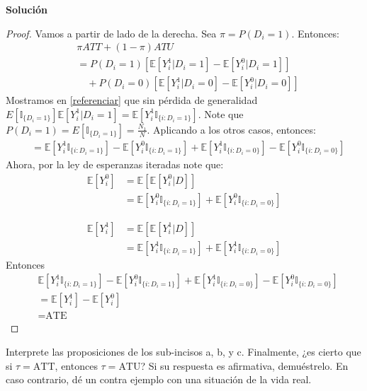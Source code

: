 \documentclass[a4paper, answers, addpoints, 11pt]{exam}
\newenvironment{solucion}{%
  \begin{mdframed}[
    backgroundcolor=blue!5,    %
    linecolor=blue!50,          %
    linewidth=2pt,              %
    leftmargin=10pt,            %
    rightmargin=8pt,           %
    topline=true,              %
    bottomline=true,            %
    roundcorner=10pt,           %
    innerleftmargin=10pt,       %
    innerrightmargin=10pt,      %
    innerbottommargin=10pt,     %
    innertopmargin=10pt         %
  ]%
  \begin{tcolorbox}[colframe=blue!50!black, colback=blue!50, coltitle=white, sharp corners=all, boxrule=1mm, width=\textwidth, halign=left, valign=center, top=0mm, bottom=0mm, left=0mm, right=0mm] \textbf{Solución} \end{tcolorbox} }{\end{mdframed}}
\begin{document}
\begin{itemize}
\begin{itemize}
\begin{solucion}
\begin{proof}
       Vamos a partir de lado de la derecha. Sea $\pi = P(D_i=1)$. Entonces:
\begin{align*}
    & \pi ATT + (1 - \pi) ATU \\
    &= P(D_i=1) \left[ \mathbb{E}[Y_i^1 | D_i=1] - \mathbb{E}[Y_i^0 | D_i=1] \right] \\
    &\quad + P(D_i=0) \left[ \mathbb{E}[Y_i^1 | D_i=0] - \mathbb{E}[Y_i^0 | D_i=0] \right] 
    \end{align*}
    Mostramos en \ref{referenciar} que sin pérdida de generalidad $E[\mathbb{I}_{\{D_i=1\}}]  \mathbb{E}[Y_i^1 | D_i=1] =\mathbb{E}[Y_i^1 \mathbb{I}_{\{i: D_i=1\}}]$. Note que  $ P(D_i=1)=E[\mathbb{I}_{\{D_i=1\}}] =\frac{N_1}{N}$. Aplicando a los otros casos, entonces:
    \begin{align*}
    &= \mathbb{E}[Y_i^1 \mathbb{I}_{\{i: D_i=1\}}] - \mathbb{E}[Y_i^0 \mathbb{I}_{\{i: D_i=1\}}]  + \mathbb{E}[Y_i^1 \mathbb{I}_{\{i: D_i=0\}}] - \mathbb{E}[Y_i^0 \mathbb{I}_{\{i: D_i=0\}}] 
\end{align*}
Ahora, por la ley de esperanzas iteradas note que:
\begin{align*}
\mathbb{E}[Y_i^0] &=\mathbb{E}[\mathbb{E}[Y_i^0 | D]]\\
    &=\mathbb{E}[Y_i^0 \mathbb{I}_{\{i: D_i=1\}}] +\mathbb{E}[Y_i^0 \mathbb{I}_{\{i: D_i=0\}}] 
\end{align*}

\begin{align*}
\mathbb{E}[Y_i^1] &=\mathbb{E}[\mathbb{E}[Y_i^1 | D]]\\
    &=\mathbb{E}[Y_i^1 \mathbb{I}_{\{i: D_i=1\}}] +\mathbb{E}[Y_i^1 \mathbb{I}_{\{i: D_i=0\}}] 
\end{align*}
Entonces
\begin{align*}
 & \mathbb{E}[Y_i^1 \mathbb{I}_{\{i: D_i=1\}}] - \mathbb{E}[Y_i^0 \mathbb{I}_{\{i: D_i=1\}}]  + \mathbb{E}[Y_i^1 \mathbb{I}_{\{i: D_i=0\}}] - \mathbb{E}[Y_i^0 \mathbb{I}_{\{i: D_i=0\}}] \\
    &= \mathbb{E}[Y_i^1] - \mathbb{E}[Y_i^0] \\
    &= \text{ATE}
\end{align*}
 \end{proof}
        \end{solucion}
    \end{itemize}
    
    Interprete las proposiciones de los sub-incisos a, b, y c. Finalmente, ¿es cierto que si $\tau = \text{ATT}$, entonces $\tau = \text{ATU}$? Si su respuesta es afirmativa, demuéstrelo. En caso contrario, dé un contra ejemplo con una situación de la vida real. 
\end{itemize}
\end{document}

